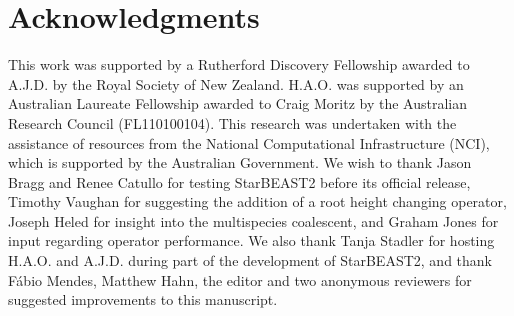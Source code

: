 \documentclass[nogrid]{MBE}%
\begin{document}
\section{Acknowledgments}

This work was supported by a Rutherford Discovery Fellowship awarded to A.J.D.
by the Royal Society of New Zealand. H.A.O. was supported by an Australian
Laureate Fellowship awarded to Craig Moritz by the Australian Research Council
(FL110100104). This research was undertaken with the assistance of resources
from the National Computational Infrastructure (NCI), which is supported by
the Australian Government. We wish to thank Jason Bragg and Renee Catullo for
testing StarBEAST2 before its official release, Timothy Vaughan for suggesting
the addition of a root height changing operator, Joseph Heled for insight into
the multispecies coalescent, and Graham Jones for input regarding operator
performance. We also thank Tanja Stadler for hosting H.A.O. and A.J.D. during
part of the development of StarBEAST2, and thank F\'abio Mendes, Matthew Hahn,
the editor and two anonymous reviewers for suggested improvements to this
manuscript.

\end{document}
